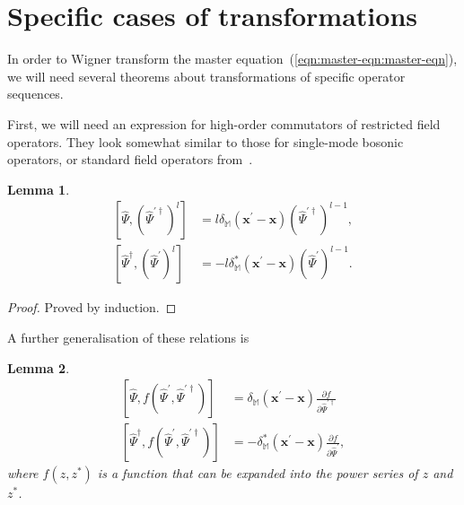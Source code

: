 \documentclass[12pt,aip,jmp,amssymb,amsmath]{revtex4-1}
\newcommand{\xvec}{\boldsymbol{x}}
\newcommand{\Psiop}{\hat{\Psi}}
\newcommand{\restbasis}{\mathbb{M}}
\newcommand{\eqnref}[1]{(\ref{eqn:#1})}
\newtheorem{lemma}{Lemma}
\begin{document}
\section{Specific cases of transformations}

In order to Wigner transform the master equation~\eqnref{master-eqn:master-eqn}, we will need several theorems about transformations of specific operator sequences.

First, we will need an expression for high-order commutators of restricted field operators.
They look somewhat similar to those for single-mode bosonic operators, or standard field operators from~\cite{Louisell1990}.

\begin{lemma}
    \begin{equation*}\begin{split}
        \left[ \Psiop, ( \Psiop^{\prime\dagger} )^l \right]
        & = l \delta_{\restbasis} (\xvec^\prime - \xvec) ( \Psiop^{\prime\dagger} )^{l-1}, \\
        \left[ \Psiop^\dagger, ( \Psiop^\prime )^l \right]
        & = - l \delta_{\restbasis}^* (\xvec^\prime - \xvec) ( \Psiop^\prime )^{l-1}.
    \end{split}\end{equation*}
\end{lemma}
\begin{proof}
Proved by induction.
\end{proof}

A further generalisation of these relations is

\begin{lemma}
\label{lmm:func-operators:functional-commutators}
    \begin{equation*}\begin{split}
        \left[ \Psiop, f( \Psiop^\prime, \Psiop^{\prime\dagger} ) \right]
        & = \delta_{\restbasis} (\xvec^\prime - \xvec) \frac{\partial f}{\partial \Psiop^{\prime\dagger}} \\
        \left[ \Psiop^\dagger, f( \Psiop^\prime, \Psiop^{\prime\dagger} ) \right]
        & = -\delta_{\restbasis}^* (\xvec^\prime - \xvec) \frac{\partial f}{\partial \Psiop^\prime},
    \end{split}\end{equation*}
    where $f(z, z^*)$ is a function that can be expanded into the power series of $z$ and $z^*$.
\end{lemma}
\end{document}
